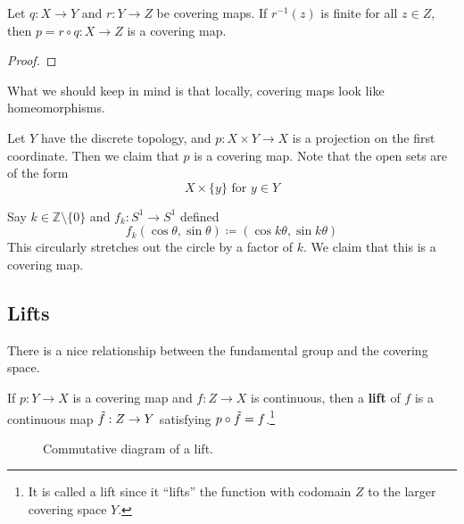   \begin{theorem}
    Let $q: X \to Y$ and $r: Y \to Z$ be covering maps. If $r^{-1}(z)$ is finite for all $z \in Z$, then $p = r \circ q: X \to Z$ is a covering map. 
  \end{theorem}
  \begin{proof}
    
  \end{proof}

  What we should keep in mind is that locally, covering maps look like homeomorphisms. 

  \begin{example}
    Let $Y$ have the discrete topology, and $p: X \times Y \to X$ is a projection on the first coordinate. Then we claim that $p$ is a covering map. Note that the open sets are of the form 
    \begin{equation}
      X \times \{y\} \text{ for } y \in Y
    \end{equation}
  \end{example}

  \begin{example}
    Say $k \in \mathbb{Z} \setminus \{0\}$ and $f_k : S^1 \to S^1$ defined 
    \begin{equation}
      f_k (\cos{\theta}, \sin{\theta}) \coloneqq (\cos{k \theta}, \sin{k\theta})
    \end{equation}
    This circularly stretches out the circle by a factor of $k$. We claim that this is a covering map. 
  \end{example}

\subsection{Lifts}
  
  There is a nice relationship between the fundamental group and the covering space. 

  \begin{definition}[Lift]
    If $p: Y \to X$ is a covering map and $f: Z \to X$ is continuous, then a \textbf{lift} of $f$ is a continuous map $\Tilde{f}: Z \to Y$ satisfying $p \circ \Tilde{f} = f$.\footnote{It is called a lift since it ``lifts'' the function with codomain $Z$ to the larger covering space $Y$.}

    \begin{figure}[H]
      \centering 
      \caption{Commutative diagram of a lift.} 
      \label{fig:lift}
    \end{figure}
  \end{definition}

